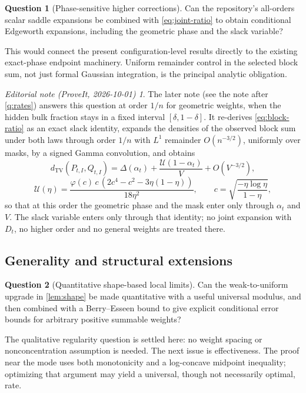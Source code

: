 \documentclass[11pt,a4paper]{article}
\numberwithin{equation}{section}
\theoremstyle{definition}
\newtheorem{question}[question]{Question}
\theoremstyle{remark}
\newtheorem*{ednotelater}{Editorial note (ProveIt, 2026-10-01)}
\newcommand{\TV}{d_{\mathrm{TV}}}
\newcommand{\phiN}{\varphi}
\begin{document}
\begin{question}[Phase-sensitive higher corrections]\label{q:edgeworth}
Can the repository's all-orders scalar saddle expansions be
combined with \cref{eq:joint-ratio} to obtain conditional Edgeworth
expansions, including the geometric phase and the slack variable?
\end{question}
This would connect the present configuration-level results directly
to the existing exact-phase endpoint machinery. Uniform remainder
control in the selected block sum, not just formal Gaussian
integration, is the principal analytic obligation.
\begin{ednotelater}
The later note  (see the note
after \cref{q:rates}) answers this question at order $1/n$ for geometric
weights, when the hidden bulk fraction stays in a fixed interval
$[\delta,1-\delta]$. It re-derives \cref{eq:block-ratio} as an exact slack
identity, expands the densities of the observed block sum under both laws
through order $1/n$ with $L^1$ remainder $O(n^{-3/2})$, uniformly over masks,
by a signed Gamma convolution, and obtains
\[
 \TV(P_{t,I},Q_{t,I})=\Delta(\alpha_t)+\frac{\mathcal U(1-\alpha_t)}{V}
 +O(V^{-3/2}),
\]
\[
 \mathcal U(\eta)=\frac{\phiN(c)\,c\,(2c^4-c^2-3\eta(1-\eta))}{18\eta^2},
 \qquad c=\sqrt{\frac{-\eta\log\eta}{1-\eta}},
\]
so that at this order the geometric phase and the mask enter only through
$\alpha_t$ and $V$. The slack variable enters only through that identity; no
joint expansion with $D_t$, no higher order and no general weights are treated
there.
\end{ednotelater}

\subsection{Generality and structural extensions}
\begin{question}[Quantitative shape-based local limits]\label{q:shape}
Can the weak-to-uniform upgrade in \cref{lem:shape} be made
quantitative with a useful universal modulus, and then combined
with a Berry--Esseen bound to give explicit conditional error
bounds for arbitrary positive summable weights?
\end{question}
The qualitative regularity question is settled here: no weight
spacing or nonconcentration assumption is needed. The next issue
is effectiveness. The proof near the mode uses both monotonicity
and a log-concave midpoint inequality; optimizing that argument
may yield a universal, though not necessarily optimal, rate.
\end{document}
